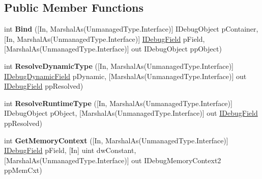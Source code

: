 \subsection*{Public Member Functions}
\begin{DoxyCompactItemize}
\item 
\hypertarget{interface_microsoft_1_1_visual_studio_1_1_debugger_1_1_interop_e_e_1_1_i_debug_binder3_a1a8392c77a1d9001c5da8ae266d8dc2f}{int {\bfseries Bind} (\mbox{[}In, Marshal\+As(Unmanaged\+Type.\+Interface)\mbox{]} I\+Debug\+Object p\+Container, \mbox{[}In, Marshal\+As(Unmanaged\+Type.\+Interface)\mbox{]} \hyperlink{interface_microsoft_1_1_visual_studio_1_1_debugger_1_1_interop_e_e_1_1_i_debug_field}{I\+Debug\+Field} p\+Field, \mbox{[}Marshal\+As(Unmanaged\+Type.\+Interface)\mbox{]} out I\+Debug\+Object pp\+Object)}\label{interface_microsoft_1_1_visual_studio_1_1_debugger_1_1_interop_e_e_1_1_i_debug_binder3_a1a8392c77a1d9001c5da8ae266d8dc2f}

\item 
\hypertarget{interface_microsoft_1_1_visual_studio_1_1_debugger_1_1_interop_e_e_1_1_i_debug_binder3_a4d2117c2a6fbb97bd6349f93213dd632}{int {\bfseries Resolve\+Dynamic\+Type} (\mbox{[}In, Marshal\+As(Unmanaged\+Type.\+Interface)\mbox{]} \hyperlink{interface_microsoft_1_1_visual_studio_1_1_debugger_1_1_interop_e_e_1_1_i_debug_dynamic_field}{I\+Debug\+Dynamic\+Field} p\+Dynamic, \mbox{[}Marshal\+As(Unmanaged\+Type.\+Interface)\mbox{]} out \hyperlink{interface_microsoft_1_1_visual_studio_1_1_debugger_1_1_interop_e_e_1_1_i_debug_field}{I\+Debug\+Field} pp\+Resolved)}\label{interface_microsoft_1_1_visual_studio_1_1_debugger_1_1_interop_e_e_1_1_i_debug_binder3_a4d2117c2a6fbb97bd6349f93213dd632}

\item 
\hypertarget{interface_microsoft_1_1_visual_studio_1_1_debugger_1_1_interop_e_e_1_1_i_debug_binder3_a32e85442ccc8ddb93f4a9f545820941f}{int {\bfseries Resolve\+Runtime\+Type} (\mbox{[}In, Marshal\+As(Unmanaged\+Type.\+Interface)\mbox{]} I\+Debug\+Object p\+Object, \mbox{[}Marshal\+As(Unmanaged\+Type.\+Interface)\mbox{]} out \hyperlink{interface_microsoft_1_1_visual_studio_1_1_debugger_1_1_interop_e_e_1_1_i_debug_field}{I\+Debug\+Field} pp\+Resolved)}\label{interface_microsoft_1_1_visual_studio_1_1_debugger_1_1_interop_e_e_1_1_i_debug_binder3_a32e85442ccc8ddb93f4a9f545820941f}

\item 
\hypertarget{interface_microsoft_1_1_visual_studio_1_1_debugger_1_1_interop_e_e_1_1_i_debug_binder3_abb5c2f1629db8780b0a9b8947e726ded}{int {\bfseries Get\+Memory\+Context} (\mbox{[}In, Marshal\+As(Unmanaged\+Type.\+Interface)\mbox{]} \hyperlink{interface_microsoft_1_1_visual_studio_1_1_debugger_1_1_interop_e_e_1_1_i_debug_field}{I\+Debug\+Field} p\+Field, \mbox{[}In\mbox{]} uint dw\+Constant, \mbox{[}Marshal\+As(Unmanaged\+Type.\+Interface)\mbox{]} out I\+Debug\+Memory\+Context2 pp\+Mem\+Cxt)}\label{interface_microsoft_1_1_visual_studio_1_1_debugger_1_1_interop_e_e_1_1_i_debug_binder3_abb5c2f1629db8780b0a9b8947e726ded}


\end{DoxyCompactItemize}
